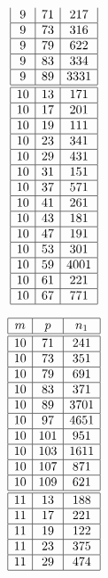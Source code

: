 \documentclass[a4paper, 10pt]{article}
\begin{document}
\begin{center}
\begin{minipage}[t]{.23\textwidth}
\begin{displaymath}
\begin{array}{|c|c|c|}
9 & 71 & 217 \\ \hline
9 & 73 & 316 \\ \hline
9 & 79 & 622 \\ \hline
9 & 83 & 334 \\ \hline
9 & 89 & 3331 \\ \hline
\hline
10 & 13 & 171 \\ \hline
10 & 17 & 201 \\ \hline
10 & 19 & 111 \\ \hline
10 & 23 & 341 \\ \hline
10 & 29 & 431 \\ \hline
10 & 31 & 151 \\ \hline
10 & 37 & 571 \\ \hline
10 & 41 & 261 \\ \hline
10 & 43 & 181 \\ \hline
10 & 47 & 191 \\ \hline
10 & 53 & 301 \\ \hline
10 & 59 & 4001 \\ \hline
10 & 61 & 221 \\ \hline
10 & 67 & 771 \\ \hline
\end{array}
\end{displaymath}
\end{minipage}
\begin{minipage}[t]{.23\textwidth}
\begin{displaymath}
\begin{array}{|c|c|c|}
\hline
m & p & n_{1} \\ \hline
\hline
10 & 71 & 241 \\ \hline
10 & 73 & 351 \\ \hline
10 & 79 & 691 \\ \hline
10 & 83 & 371 \\ \hline
10 & 89 & 3701 \\ \hline
10 & 97 & 4651 \\ \hline
10 & 101 & 951 \\ \hline
10 & 103 & 1611 \\ \hline
10 & 107 & 871 \\ \hline
10 & 109 & 621 \\ \hline
\hline
11 & 13 & 188 \\ \hline
11 & 17 & 221 \\ \hline
11 & 19 & 122 \\ \hline
11 & 23 & 375 \\ \hline
11 & 29 & 474 \\ \hline

\end{array}
\end{displaymath}
\end{minipage}
\end{center}
\end{document}
